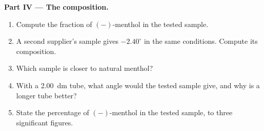 \begin{problem}
\medskip
\noindent\textbf{Part IV --- The composition.}
\begin{enumerate}[resume]
  \item Compute the fraction of $(-)$-menthol in the tested sample.
  \item A second supplier's sample gives $-2.40^\circ$ in the same
        conditions. Compute its composition.
  \item Which sample is closer to natural menthol?
  \item With a \qty{2.00}{dm} tube, what angle would the tested sample
        give, and why is a longer tube better?
  \item State the percentage of $(-)$-menthol in the tested sample, to
        three significant figures.
\end{enumerate}
\end{problem}

